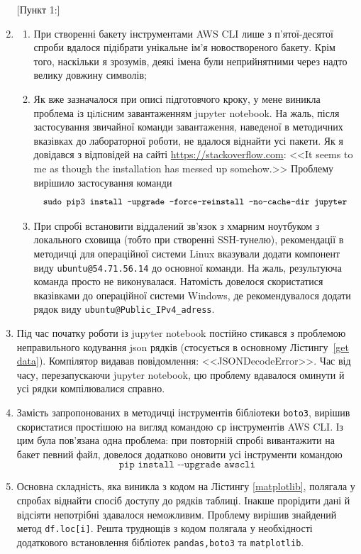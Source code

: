 \documentclass[a4paper,14pt]{extarticle} %
\begin{document}
\begin{enumerate} [Пункт 1:]
    \item [Пункт 0:] 
        \begin{enumerate} 
            \item При створенні бакету інструментами AWS CLI лише з п'ятої-десятої спроби вдалося підібрати 
            унікальне ім'я новоствореного бакету. Крім того, наскільки я зрозумів, деякі імена були неприйнятними 
            через надто велику довжину символів;

            \item Як вже зазначалося при описі підготовчого кроку, у мене виникла проблема iз цiлiсним 
            завантаженням jupyter notebook. На жаль, після застосування звичайної команди завантаження, наведеної 
            в методичних вказівках до лабораторної роботи, не вдалося віднайти усі пакети. Як я довідався 
            з відповідей на сайті \url{https://stackoverflow.com}: 
            <<It seems to me as though the installation has messed up somehow.>> Проблему вирішило застосування команди 
            \[ \text{\small\texttt{sudo pip3 install --upgrade --force-reinstall --no-cache-dir jupyter}} \]

            \item При спробі встановити віддалений зв'язок з хмарним ноутбуком з локального сховища (тобто 
            при створенні SSH-тунелю), рекомендації в методичці для операційної системи Linux 
            вказували додати компонент виду \texttt{ubuntu@54.71.56.14} до основної команди. На жаль, результуюча 
            команда просто не виконувалася. Натомість довелося скористатися вказівками до операційної системи 
            Windows, де рекомендувалося додати рядок виду \texttt{ubuntu@Public\_IPv4\_adress}.
        \end{enumerate}

    \item [Пункт 1:] Під час початку роботи із jupyter notebook постійно стикався з проблемою неправильного кодування 
    json рядків (стосується в основному Лістингу~\ref{get data}). Компілятор видавав повідомлення: <<JSONDecodeError>>. 
    Час від часу, перезапускаючи jupyter notebook, цю проблему вдавалося оминути й усі рядки компілювалися справно.

    \item [Пункт 3:] Замість запропонованих в методичці інструментів бібліотеки \texttt{boto3}, вирішив скористатися 
    простішою на вигляд командою \texttt{cp} інструментів AWS CLI. Із цим була пов'язана одна проблема: при повторній 
    спробі вивантажити на бакет певний файл, довелося додатково оновити усі інструменти командою 
    \[ \texttt{pip install {-}{-}upgrade awscli} \]

    \item [Пункт 5:] Основна складність, яка виникла з кодом на Лістингу \ref{matplotlib}, полягала у спробах 
    віднайти спосіб доступу до рядків таблиці. Інакше прорідити дані й відсіяти непотрібні здавалося неможливим. 
    Проблему вирішив знайдений метод \texttt{df.loc[i]}. Решта труднощів з кодом полягала у необхідності додат\-кового 
    встановлення бібліотек \texttt{pandas,boto3} та \texttt{matplotlib}.
\end{enumerate}
\end{document}
